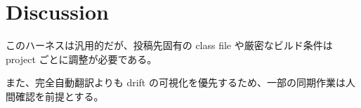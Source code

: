 \section{Discussion}

このハーネスは汎用的だが、投稿先固有の class file や厳密なビルド条件は project ごとに調整が必要である。

また、完全自動翻訳よりも drift の可視化を優先するため、一部の同期作業は人間確認を前提とする。
